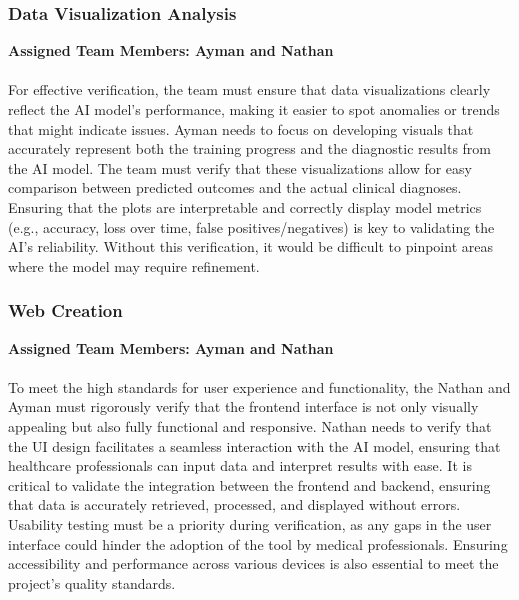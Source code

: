 \documentclass[12pt, titlepage]{article}
\begin{document}
\subsubsection{Data Visualization Analysis}
\textbf{Assigned Team Members: Ayman and Nathan}\\\\ 
For effective verification, the team must ensure that data visualizations clearly reflect the AI model’s performance, making it easier to spot anomalies or trends that might indicate issues. Ayman needs to focus on developing visuals that accurately represent both the training progress and the diagnostic results from the AI model. The team must verify that these visualizations allow for easy comparison between predicted outcomes and the actual clinical diagnoses. Ensuring that the plots are interpretable and correctly display model metrics (e.g., accuracy, loss over time, false positives/negatives) is key to validating the AI’s reliability. Without this verification, it would be difficult to pinpoint areas where the model may require refinement.


\subsubsection{Web Creation}
\textbf{Assigned Team Members: Ayman and Nathan} \\\\
To meet the high standards for user experience and functionality, the Nathan and Ayman must rigorously verify that the frontend interface is not only visually appealing but also fully functional and responsive. Nathan needs to verify that the UI design facilitates a seamless interaction with the AI model, ensuring that healthcare professionals can input data and interpret results with ease. It is critical to validate the integration between the frontend and backend, ensuring that data is accurately retrieved, processed, and displayed without errors. Usability testing must be a priority during verification, as any gaps in the user interface could hinder the adoption of the tool by medical professionals. Ensuring accessibility and performance across various devices is also essential to meet the project’s quality standards.
\end{document}
